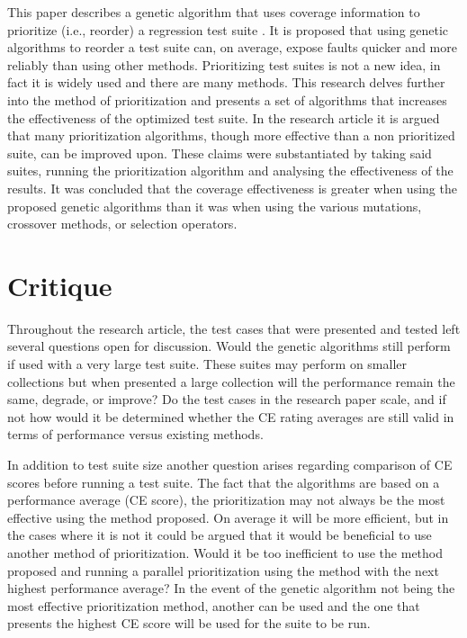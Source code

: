 \documentclass[11pt]{article}
\begin{document}
This paper describes a genetic algorithm that uses coverage
  information to prioritize (i.e., reorder) a regression test suite
  \cite{conrad-gecco-selection-study}. It is proposed that using genetic algorithms to reorder a test suite can, on average, expose faults quicker and more reliably than using other methods. Prioritizing test suites is not a new idea, in fact it is widely used and there are many methods. This research delves further into the method of prioritization and presents a set of algorithms that increases the effectiveness of the optimized test suite. In the research article it is argued that many prioritization algorithms, though more effective than a non prioritized suite, can be improved upon. These claims were substantiated by taking said suites, running the prioritization algorithm and analysing the effectiveness of the results. It was concluded that the coverage effectiveness is greater when using the proposed genetic algorithms than it was when using the various mutations, crossover methods, or selection operators.

\vspace*{-.1in}
\section{Critique}
\label{sec:critique}
\vspace*{-.1in}

Throughout the research article, the test cases that were presented and tested left several questions open for discussion. Would the genetic algorithms still perform if used with a very large test suite. These suites may perform on smaller collections but when presented a large collection will the performance remain the same, degrade, or improve? Do the test cases in the research paper scale, and if not how would it be determined whether the CE rating averages are still valid in terms of performance versus existing methods.

In addition to test suite size another question arises regarding comparison of CE scores before running a test suite. The fact that the algorithms are based on a performance average (CE score), the prioritization may not always be the most effective using the method proposed. On average it will be more efficient, but in the cases where it is not it could be argued that it would be beneficial to use another method of prioritization. Would it be too inefficient to use the method proposed and running a parallel prioritization using the method with the next highest performance average? In the event of the genetic algorithm not being the most effective prioritization method, another can be used and the one that presents the highest CE score will be used for the suite to be run. 
\end{document}
